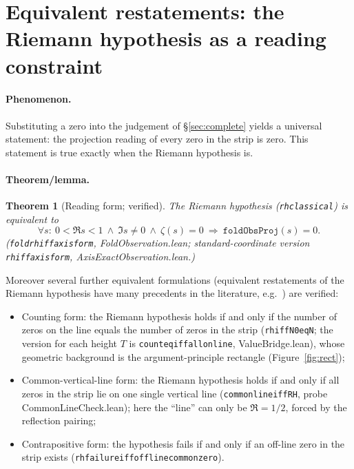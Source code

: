 \documentclass{article}
\renewcommand{\_}{\underscoreOrig\allowbreak}
\newtheorem{theorem}{Theorem}[section]
\newcommand{\zt}{\zeta}
\begin{document}
\section{Equivalent restatements: the Riemann hypothesis as a reading
constraint}
\label{sec:equivalence}

\paragraph{Phenomenon.} Substituting a zero into the judgement of
\S\ref{sec:complete} yields a universal statement: the projection reading
of every zero in the strip is zero. This statement is true exactly when
the Riemann hypothesis is.

\paragraph{Theorem/lemma.}
\begin{theorem}[Reading form; verified]
\label{thm:equiv}
The Riemann hypothesis (\texttt{rh\_classical}) is equivalent to
\[
  \forall s:\ 0<\Re s<1 \ \wedge\ \Im s\ne0\ \wedge\ \zt(s)=0
  \ \Longrightarrow\ \texttt{foldObsProj}(s)=0 .
\]
(\texttt{fold\_rh\_iff\_axis\_form}, FoldObservation.lean;
standard-coordinate version \texttt{rh\_iff\_axis\_form},
AxisExactObservation.lean.)
\end{theorem}
Moreover several further equivalent formulations (equivalent
restatements of the Riemann hypothesis have many precedents in the
literature, e.g.\ \cite{lagarias2002}) are verified:
\begin{itemize}
\item Counting form: the Riemann hypothesis holds if and only if the
number of zeros on the line equals the number of zeros in the strip
(\texttt{rh\_iff\_N0\_eq\_N}; the version for each height $T$ is
\texttt{count\_eq\_iff\_all\_on\_line}, ValueBridge.lean), whose
geometric background is the argument-principle rectangle
(Figure~\ref{fig:rect});
\item Common-vertical-line form: the Riemann hypothesis holds if and
only if all zeros in the strip lie on one single vertical line
(\texttt{common\_line\_iff\_RH}, probe CommonLineCheck.lean); here the
``line'' can only be $\Re=1/2$, forced by the reflection pairing;
\item Contrapositive form: the hypothesis fails if and only if an
off-line zero in the strip exists
(\texttt{rh\_failure\_iff\_offline\_common\_zero}).
\end{itemize}
\end{document}
